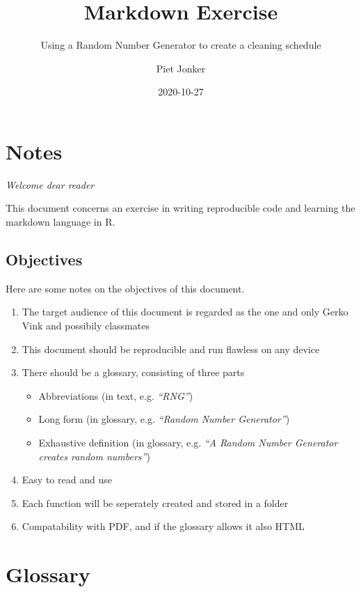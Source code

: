 \documentclass[openany]{book}
\title{Markdown Exercise}
\subtitle{Using a Random Number Generator to create a cleaning schedule}
\author{Piet Jonker}
\date{2020-10-27}
\providecommand{\tightlist}{%
  \setlength{\itemsep}{0pt}\setlength{\parskip}{0pt}}
\begin{document}
\maketitle

{
\hypersetup{linkcolor=}
\setcounter{tocdepth}{1}
\tableofcontents
}
\hypertarget{notes}{%
\chapter*{Notes}\label{notes}}

\emph{Welcome dear reader}

This document concerns an exercise in writing reproducible code and learning the markdown language in R.

\hypertarget{objectives}{%
\section*{Objectives}\label{objectives}}

Here are some notes on the objectives of this document.

\begin{enumerate}
\def\labelenumi{\arabic{enumi}.}
\tightlist
\item
  The target audience of this document is regarded as the one and only Gerko Vink and possibily classmates
\item
  This document should be reproducible and run flawless on any device
\item
  There should be a glossary, consisting of three parts

  \begin{itemize}
  \tightlist
  \item
    Abbreviations (in text, e.g. \emph{``RNG''})
  \item
    Long form (in glossary, e.g. \emph{``Random Number Generator''})
  \item
    Exhaustive definition (in glossary, e.g. \emph{``A Random Number Generator creates random numbers''})
  \end{itemize}
\item
  Easy to read and use
\item
  Each function will be seperately created and stored in a folder
\item
  Compatability with PDF, and if the glossary allows it also HTML
\end{enumerate}

\hypertarget{gloss}{%
\chapter*{Glossary}\label{gloss}}
\end{document}

